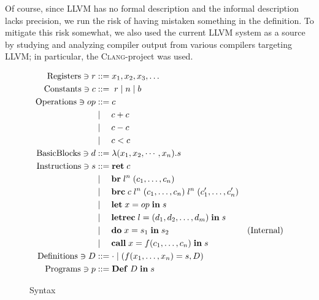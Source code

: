 \documentclass[a4paper, oneside, 10pt, draft]{memoir}
\newcommand{\clang}{\textsc{Clang}}
\begin{document}
Of course, since LLVM has no formal description and the informal
description lacks precision\cite{lattner.ea:2009:llvm-ref}, we run the
risk of having mistaken something in the definition. To mitigate this
risk somewhat, we also used the current LLVM system as a source by
studying and analyzing compiler output from various compilers
targeting LLVM; in particular, the \clang{}-project was used.

\newcommand{\registers}{\mathrm{Registers}}
\newcommand{\constants}{\mathrm{Constants}}
\newcommand{\operations}{\mathrm{Operations}}
\newcommand{\instructions}{\mathrm{Instructions}}
\newcommand{\programs}{\mathrm{Programs}}
\newcommand{\definitions}{\mathrm{Definitions}}
\newcommand{\basicblocks}{\mathrm{Basic Blocks}}
\newcommand{\iret}[1]{\mathbf{ret} \; #1}

\newcommand{\ibr}[2]{\mathbf{br} \; #1 \; #2}
\newcommand{\ibrc}[5]{\mathbf{brc} \; #1 \; #2 \; #3 \; #4 \; #5}
\newcommand{\ilet}[3]{\mathbf{let} \; #1 = #2 \; \mathbf{in} \; #3}
\newcommand{\iletrec}[3]{\mathbf{letrec} \; #1 = #2 \; \mathbf{in} \; #3}
\newcommand{\ido}[3]{\mathbf{do} \; #1 = #2 \; \mathbf{in} \; #3}
\newcommand{\icall}[4]{\mathbf{call} \; #1 = #2 #3\; \mathbf{in} \;
  #4}
\newcommand{\ipgm}[2]{\mathbf{Def} \; #1 \; \mathbf{in} \; #2}
\begin{figure}
  \begin{align*}
    \registers \ni r & ::= x_1, x_2, x_3, \dotsc\\
    \constants \ni c & ::= \; r \bor \nat \bor \bool \\
    \operations \ni op & ::= c \\
                       & \bor \quad c + c \\
                       & \bor \quad c - c \\
                       & \bor \quad c < c \\
   \basicblocks \ni d  & ::= \lambda (x_1, x_2, \cdots, x_n) . s\\
   \instructions \ni s & ::= \iret{c} \\
                       & \bor \quad \ibr{l^n}{(c_1, \dotsc, c_n)} \\
                       & \bor \quad \ibrc{c}{l^n}{(c_1, \dotsc, c_n)}{l^n}{(c'_1, \dotsc, c'_n)}\\
                       & \bor \quad \ilet{x}{op}{s} \\
                       & \bor \quad \iletrec{l}{\dbundle}{s} \\
                       & \bor \quad \ido{x}{s_1}{s_2} &
                       (\text{Internal})\\
                       & \bor \quad \icall{x}{f}{(c_1, \dotsc,
                         c_n)}{s}\\
    \definitions \ni D & ::= \cdot \bor (f(x_1, \dotsc, x_n) = s, D)\\
    \programs \ni p & ::= \ipgm{D}{s}
  \end{align*}
  \caption{Syntax}
  \label{fig:syntax}
\end{figure}
\end{document}

